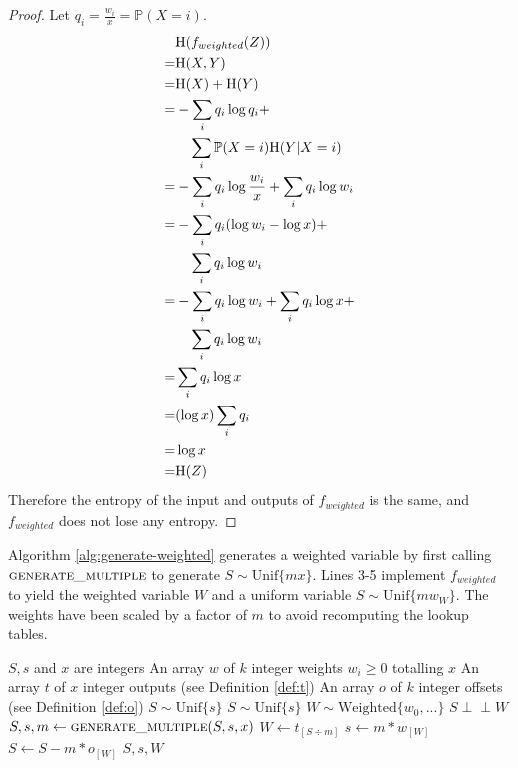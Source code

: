 \documentclass[lettersize,journal]{IEEEtran}
\newcommand{\indep}{\perp\!\!\!\perp}
\newcommand{\unif}[1]{\mathrm{Unif}\{#1\}}
\newcommand{\Entropy}{\mathrm{H}}
\newcommand{\entropy}[1]{\Entropy(#1)}
\newcommand{\Prob}{\mathbb{P}}
\newcommand{\prob}[1]{\Prob(#1)}
\begin{document}
\begin{proof}
    Let $q_i = \frac{w_i}{x} = \prob{X=i}$.
    \begin{align}
    & \entropy{f_{weighted}(Z)} \notag \\
               = & \entropy{X,Y} \\
               = & \entropy{X} + \entropy{Y} \\
                = & - \sum_i q_i \log q_i + \notag \\ 
                    & \quad \sum_i \prob{X=i}\entropy{Y|X=i} \\
                = & - \sum_i q_i \log \frac{w_i}{x} + \sum_i q_i\log w_i \\
                = & - \sum_i q_i(\log w_i - \log x) + \notag \\ 
                    & \quad \sum_i q_i\log w_i \\
                = & - \sum_i q_i\log w_i + \sum_i q_i \log x + \notag \\ 
                    & \quad\sum_i q_i\log w_i \\
                = & \sum_i q_i \log x \\
                = & (\log x) \sum_i q_i \\
                = & \log x \\
                = & \entropy{Z}
    \end{align}
    Therefore the entropy of the input and outputs of $f_{weighted}$ is the same, and $f_{weighted}$ does not lose any entropy.
\end{proof}

Algorithm \ref{alg:generate-weighted} generates a weighted variable by first calling $\textsc{generate\_multiple}$ to generate $S \sim \unif{mx}$. Lines 3-5 implement $f_{weighted}$ to yield the weighted variable $W$ and a uniform variable $S \sim \unif{mw_W}$. The weights have been scaled by a factor of $m$ to avoid recomputing the lookup tables.

\begin{algorithm}
\caption{Generating a weighted variable}
\label{alg:generate-weighted}
\begin{algorithmic}[1]
\Require $S, s$ and $x$ are integers
\Require An array $w$ of $k$ integer weights $w_i \ge 0$ totalling $x$
\Require An array $t$ of $x$ integer outputs (see Definition \ref{def:t})
\Require An array $o$ of $k$ integer offsets (see Definition \ref{def:o})
\Require $S \sim \unif{s}$
\Ensure $S \sim \unif{s}$
\Ensure $W \sim \mathrm{Weighted}\{w_0, ...\}$
\Ensure $S \indep W$
    \State $S, s, m \gets \textsc{generate\_multiple}(S, s, x)$
    \State $W \gets t_{[S \div m]}$
    \State $s \gets m * w_{[W]}$
    \State $S \gets S - m * o_{[W]}$
    \State \Return $S, s, W$
\EndProcedure
\end{algorithmic}
\end{algorithm}
\end{document}
